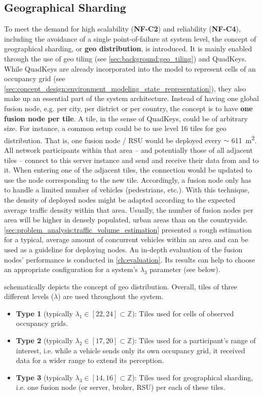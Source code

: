 \subsection{Geographical Sharding}
\label{subsec:concept_design:geographical_sharding}
To meet the demand for high scalability (\textbf{NF-C2}) and reliability (\textbf{NF-C4}), including the avoidance of a single point-of-failure at system level, the concept of geographical sharding, or \textbf{geo distribution}, is introduced. It is mainly enabled through the use of geo tiling (see \cref{sec:background:geo_tiling}) and QuadKeys. While QuadKeys are already incorporated into the model to represent cells of an occupancy grid (see \cref{sec:concept_design:environment_modeling_state_representation}), they also make up an essential part of the system architecture. Instead of having one global fusion node, e.g. per city, per district or per country, the concept is to have \textbf{one fusion node per tile}. A tile, in the sense of QuadKeys, could be of arbitrary size. For instance, a common setup could be to use level 16 tiles for geo distribution. That is, one fusion node / RSU would be deployed every $\sim$ \SI{611}{\square\meter}. All network participants within that area – and potentially those of all adjacent tiles – connect to this server instance and send and receive their data from and to it. When entering one of the adjacent tiles, the connection would be updated to use the node corresponding to the new tile. Accordingly, a fusion node only has to handle a limited number of vehicles (pedestrians, etc.). With this technique, the density of deployed nodes might be adapted according to the expected average traffic density within that area. Usually, the number of fusion nodes per area will be higher in densely populated, urban areas than on the countryside. \cref{sec:problem_analysis:traffic_volume_estimation} presented a rough estimation for a typical, average amount of concurrent vehicles within an area and can be used as a guideline for deploying nodes. An in-depth evaluation of the fusion nodes' performance is conducted in \cref{ch:evaluation}. Its results can help to choose an appropriate configuration for a system's $\lambda_3$ parameter (see below).
\par
\bigskip

 schematically depicts the concept of geo distribution. Overall, tiles of three different levels ($\lambda$) are used throughout the system.

\begin{itemize}
	\item \textbf{Type 1} (typically $\lambda_1 \in [22, 24] \subset \mathbb{Z}$): Tiles used for cells of observed occupancy grids.
	\item \textbf{Type 2} (typically $\lambda_2 \in [17, 20] \subset \mathbb{Z}$): Tiles used for a participant's range of interest, i.e. while a vehicle sends only its own occupancy grid, it received data for a wider range to extend its perception.
	\item \textbf{Type 3} (typically $\lambda_3 \in [14, 16] \subset \mathbb{Z}$): Tiles used for geographical sharding, i.e. one fusion node (or server, broker, RSU) per each of these tiles.
\end{itemize}

